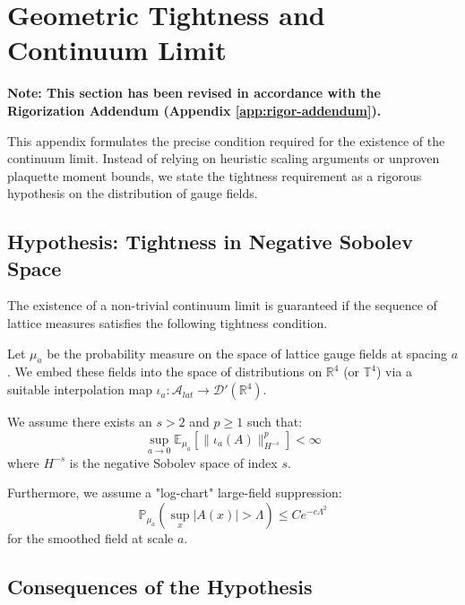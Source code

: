 \section{Geometric Tightness and Continuum Limit}
\label{app:tightness_continuum}
\label{sec:continuum-details}

\textbf{Note: This section has been revised in accordance with the Rigorization Addendum (Appendix \ref{app:rigor-addendum}).}

This appendix formulates the precise condition required for the existence of the continuum limit. Instead of relying on heuristic scaling arguments or unproven plaquette moment bounds, we state the tightness requirement as a rigorous hypothesis on the distribution of gauge fields.

\subsection{Hypothesis: Tightness in Negative Sobolev Space}

The existence of a non-trivial continuum limit is guaranteed if the sequence of lattice measures satisfies the following tightness condition.

\begin{hypothesis}[Tightness in $H^{-s}$]
\label{hyp:tightness-sobolev-v2}
Let $\mu_a$ be the probability measure on the space of lattice gauge fields at spacing $a$. We embed these fields into the space of distributions on $\mathbb{R}^4$ (or $\mathbb{T}^4$) via a suitable interpolation map $\iota_a: \mathcal{A}_{lat} \to \mathcal{D}'(\mathbb{R}^4)$.

We assume there exists an $s > 2$ and $p \ge 1$ such that:
\begin{equation}
\sup_{a \to 0} \mathbb{E}_{\mu_a} \left[ \| \iota_a(A) \|_{H^{-s}}^p \right] < \infty
\end{equation}
where $H^{-s}$ is the negative Sobolev space of index $s$.

Furthermore, we assume a "log-chart" large-field suppression:
\begin{equation}
\mathbb{P}_{\mu_a} \left( \sup_{x} |A(x)| > \Lambda \right) \le C e^{-c \Lambda^2}
\end{equation}
for the smoothed field at scale $a$.
\end{hypothesis}

\subsection{Consequences of the Hypothesis}

